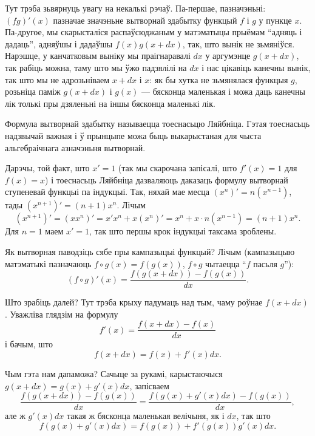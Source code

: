 \documentclass[10pt,a4paper]{book}
\theoremstyle{plain}
\begin{document}
Тут трэба зьвярнуць увагу на некалькі рэчаў. Па-першае, пазначэньні: $(fg)'(x)$
пазначае значэньне вытворнай здабытку функцый $f$ і $g$ у пункце $x$. Па-другое,
мы скарысталіся распаўсюджаным у матэматыцы прыёмам ``адняць і дадаць'', адняўшы
і дадаўшы $f(x)g(x+dx)$, так, што вынік не зьмяніўся. Нарэшце, у канчатковым
выніку мы праігнаравалі $dx$ у аргумэнце $g(x+dx)$, так рабіць можна, таму што
мы ўжо падзялілі на $dx$ і нас цікавіць канечны вынік, так што мы не
адрозьніваем $x+dx$ і $x$: як бы хутка не зьмянялася функцыя $g$, розьніца паміж
$g(x+dx)$ і $g(x)$ --- бясконца маленькая і можа даць канечны лік толькі пры
дзяленьні на іншы бясконца маленькі лік.

Формула вытворнай здабытку называецца тоеснасьцю Ляйбніца. Гэтая тоеснасьць
надзвычай важная і ў прынцыпе можа быць выкарыстаная для чыста альгебраічнага
азначэньня вытворнай.

Дарэчы, той факт, што $x'=1$ (так мы скарочана запісалі, што $f'(x) = 1$ для
$f(x) = x$) і тоеснасьць Ляйбніца дазваляюць даказаць формулу вытворнай
ступеневай функцыі па індукцыі. Так, няхай мае месца $(x^n)' = n(x^{n-1})$, тады
$(x^{n+1})' = (n+1)x^n$. Лічым
\begin{equation*}
  (x^{n+1})' = (xx^n)' = x'x^n + x(x^n)' = x^n + x \cdot n (x^{n-1}) =
  (n+1)x^n.
\end{equation*}
Для $n=1$ маем $x'=1$, так што першы крок індукцыі таксама зроблены.

Як вытворная паводзіць сябе пры кампазыцыі функцый? Лічым (кампазыцыю матэматыкі
пазначаюць $f \circ g(x) = f(g(x))$, $f \circ g$ чытаецца ``$f$ пасьля
$g$''):
\begin{equation*}
  (f\circ g)'(x) = \frac{f(g(x+dx)) - f(g(x))}{dx}.
\end{equation*}

Што зрабіць далей? Тут трэба крыху падумаць над тым, чаму роўнае
$f(x+dx)$. Уважліва глядзім на формулу
\begin{equation*}
  f'(x) = \frac{f(x+dx) - f(x)}{dx}
\end{equation*}
і бачым, што
\begin{equation*}
  f(x+dx) = f(x) + f'(x)dx.
\end{equation*}

Чым гэта нам дапаможа? Сачыце за рукамі, карыстаючыся $g(x+dx) = g(x) +
g'(x)dx$, запісваем
\begin{equation*}
  \frac{f(g(x+dx)) - f(g(x))}{dx} = \frac{f(g(x) + g'(x)dx) - f(g(x))}{dx},
\end{equation*}
але ж $g'(x)dx$ такая ж бясконца маленькая велічыня, як і $dx$, так што
\begin{equation*}
  f(g(x) + g'(x)dx) = f(g(x)) + f'(g(x))g'(x)dx.
\end{equation*}
\end{document}
